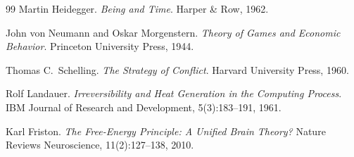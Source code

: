 \documentclass[11pt]{article}
\begin{document}
\begin{thebibliography}{99}
Martin Heidegger.
\newblock \emph{Being and Time}.
\newblock Harper \& Row, 1962.

John von Neumann and Oskar Morgenstern.
\newblock \emph{Theory of Games and Economic Behavior}.
\newblock Princeton University Press, 1944.

Thomas C.~Schelling.
\newblock \emph{The Strategy of Conflict}.
\newblock Harvard University Press, 1960.

Rolf Landauer.
\newblock \emph{Irreversibility and Heat Generation in the Computing Process}.
\newblock IBM Journal of Research and Development, 5(3):183--191, 1961.

Karl Friston.
\newblock \emph{The Free-Energy Principle: A Unified Brain Theory?}
\newblock Nature Reviews Neuroscience, 11(2):127--138, 2010.

\end{thebibliography}
\end{document}
